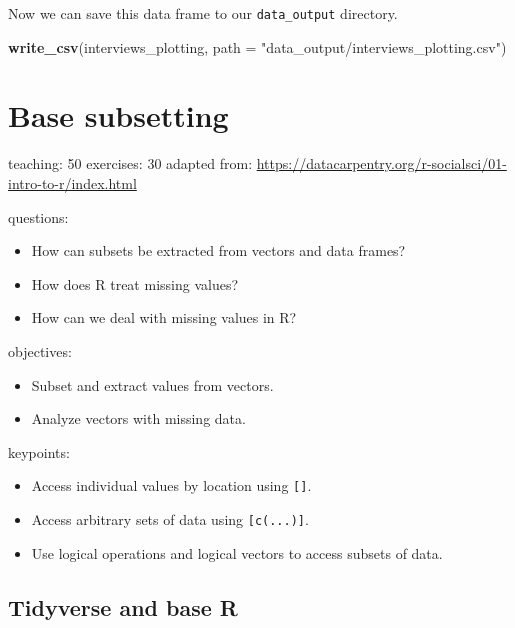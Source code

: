\documentclass[]{book}
\newenvironment{Shaded}{\begin{snugshade}}{\end{snugshade}}
\newcommand{\KeywordTok}[1]{\textcolor[rgb]{0.13,0.29,0.53}{\textbf{#1}}}
\newcommand{\DataTypeTok}[1]{\textcolor[rgb]{0.13,0.29,0.53}{#1}}
\newcommand{\StringTok}[1]{\textcolor[rgb]{0.31,0.60,0.02}{#1}}
\newcommand{\NormalTok}[1]{#1}
\providecommand{\tightlist}{%
  \setlength{\itemsep}{0pt}\setlength{\parskip}{0pt}}
\begin{document}
Now we can save this data frame to our \texttt{data\_output} directory.

\begin{Shaded}
\begin{Highlighting}[]
\KeywordTok{write_csv}\NormalTok{(interviews_plotting, }\DataTypeTok{path =} \StringTok{"data_output/interviews_plotting.csv"}\NormalTok{)}
\end{Highlighting}
\end{Shaded}

\chapter{Base subsetting}\label{base-subsetting}

teaching: 50 exercises: 30 adapted from:
\url{https://datacarpentry.org/r-socialsci/01-intro-to-r/index.html}

questions:

\begin{itemize}
\tightlist
\item
  How can subsets be extracted from vectors and data frames?
\item
  How does R treat missing values?
\item
  How can we deal with missing values in R?
\end{itemize}

objectives:

\begin{itemize}
\tightlist
\item
  Subset and extract values from vectors.
\item
  Analyze vectors with missing data.
\end{itemize}

keypoints:

\begin{itemize}
\tightlist
\item
  Access individual values by location using \texttt{{[}{]}}.
\item
  Access arbitrary sets of data using \texttt{{[}c(...){]}}.
\item
  Use logical operations and logical vectors to access subsets of data.
\end{itemize}

\section{Tidyverse and base R}\label{tidyverse-and-base-r}
\end{document}
